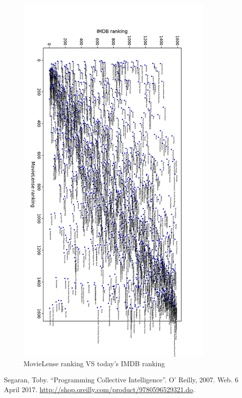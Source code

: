 \documentclass[letterpaper,11pt]{article}
\begin{document}
\begin{figure}[h]
\includegraphics[scale=1.0]{dataset/Figure_1.png}
\caption{ MovieLense ranking VS today's IMDB
ranking}
\label{fig:q2histogram}
\end{figure}




\clearpage




\begin{thebibliography}{9}

Segaran, Toby. ``Programming Collective Intelligence''. O' Reilly, 2007. Web. 6 April 2017. \url{http://shop.oreilly.com/product/9780596529321.do}.
\end{thebibliography}
\end{document}
